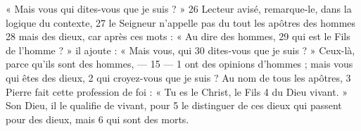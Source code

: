 « Mais vous qui dites-vous que je suis ? »  
26	 	Lecteur avisé, remarque-le, dans la logique du contexte,	 
27	 	le Seigneur n'appelle pas du tout les apôtres des hommes	 
28	 	mais des dieux, car après ces mots : « Au dire des hommes,	 
29	 	qui est le Fils de l'homme ? » il ajoute : « Mais vous, qui	 
30	 	dites-vous que je suis ? » Ceux-là, parce qu'ils sont des hommes,	 
 	--- 15 ---	 
1	 	ont des opinions d'hommes ; mais vous qui êtes des dieux,	 
2	 	qui croyez-vous que je suis ? Au nom de tous les apôtres,	 
3	 	Pierre fait cette profession de foi : « Tu es le Christ, le Fils	 
4	 	du Dieu vivant. » Son Dieu, il le qualifie de vivant, pour	 
5	 	le distinguer de ces dieux qui passent pour des dieux, mais	 
6	 	qui sont des morts.